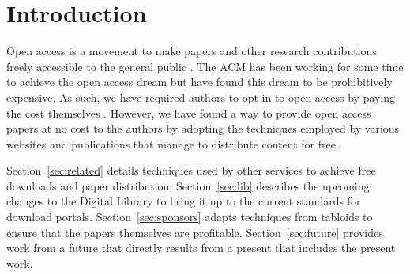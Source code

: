 \section{Introduction}
Open access is a movement to make papers and other research contributions
freely accessible to the general public \cite{oa}.
The ACM has been working for some time to achieve the open access dream but
have found this dream to be prohibitively expensive.
As such, we have required authors to opt-in to open access by paying the cost
themselves \cite{auth}.
However, we have found a way to provide open access papers at no cost to the
authors by adopting the techniques employed by various websites and
publications that manage to distribute content for free.

Section~\ref{sec:related} details techniques used by other services to achieve
free downloads and paper distribution.
Section~\ref{sec:lib} describes the upcoming changes to the Digital Library to
bring it up to the current standards for download portals.
Section~\ref{sec:sponsors} adapts techniques from tabloids to ensure that
the papers themselves are profitable.
Section~\ref{sec:future} provides work from a future that directly results from
a present that includes the present work.

